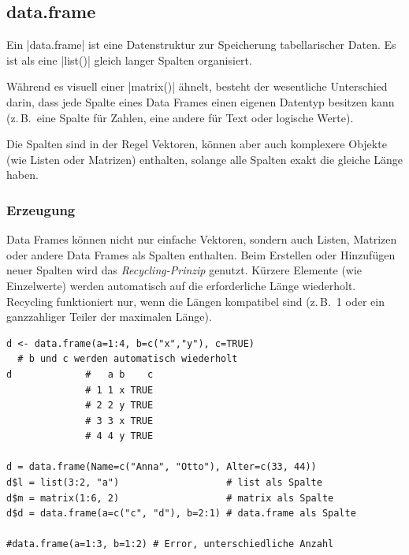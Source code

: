 \documentclass[10pt,twocolumn]{scrartcl}
\renewcommand{\lstinline}{\mycoloredinline}
\begin{document}

\subsection{data.frame}

Ein \lstinline|data.frame| ist eine Datenstruktur zur Speicherung tabellarischer Daten. Es ist als eine \lstinline|list()| gleich langer Spalten organisiert.

Während es visuell einer \lstinline|matrix()| ähnelt, besteht der wesentliche Unterschied darin, dass jede Spalte eines Data Frames einen eigenen Datentyp besitzen kann (z.\,B.\ eine Spalte für Zahlen, eine andere für Text oder logische Werte).

Die Spalten sind in der Regel Vektoren, können aber auch komplexere Objekte (wie Listen oder Matrizen) enthalten, solange alle Spalten exakt die gleiche Länge haben.


\subsubsection{Erzeugung}

Data Frames können nicht nur einfache Vektoren, sondern auch Listen, Matrizen oder andere Data Frames als Spalten enthalten. Beim Erstellen oder Hinzufügen neuer Spalten wird das \emph{Recycling-Prinzip} genutzt. Kürzere Elemente (wie Einzelwerte) werden automatisch auf die erforderliche Länge wiederholt. Recycling funktioniert nur, wenn die Längen kompatibel sind (z.\,B.\ 1 oder ein ganzzahliger Teiler der maximalen Länge).

\begin{lstlisting}
d <- data.frame(a=1:4, b=c("x","y"), c=TRUE)
  # b und c werden automatisch wiederholt
d             #   a b    c
              # 1 1 x TRUE
              # 2 2 y TRUE
              # 3 3 x TRUE
              # 4 4 y TRUE

d = data.frame(Name=c("Anna", "Otto"), Alter=c(33, 44))
d$l = list(3:2, "a")                   # list als Spalte
d$m = matrix(1:6, 2)                   # matrix als Spalte
d$d = data.frame(a=c("c", "d"), b=2:1) # data.frame als Spalte

#data.frame(a=1:3, b=1:2) # Error, unterschiedliche Anzahl
\end{lstlisting}
\end{document}

